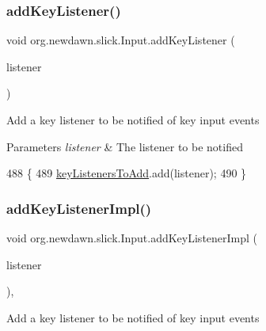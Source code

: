 \subsubsection{\texorpdfstring{add\+Key\+Listener()}{addKeyListener()}}
{\footnotesize\ttfamily void org.\+newdawn.\+slick.\+Input.\+add\+Key\+Listener (\begin{DoxyParamCaption}\item[{\mbox{\hyperlink{interfaceorg_1_1newdawn_1_1slick_1_1_key_listener}{Key\+Listener}}}]{listener }\end{DoxyParamCaption})\hspace{0.3cm}{\ttfamily [inline]}}

Add a key listener to be notified of key input events


\begin{DoxyParams}{Parameters}
{\em listener} & The listener to be notified \\
\hline
\end{DoxyParams}

\begin{DoxyCode}
488                                                      \{
489         \mbox{\hyperlink{classorg_1_1newdawn_1_1slick_1_1_input_a3bd9ce9ac5e9ac18f297b2e4382d3db9}{keyListenersToAdd}}.add(listener);
490     \}
\end{DoxyCode}
\mbox{\label{classorg_1_1newdawn_1_1slick_1_1_input_aa200a37a2a3c219b693e1cb2373e5de0}} 
\subsubsection{\texorpdfstring{add\+Key\+Listener\+Impl()}{addKeyListenerImpl()}}
{\footnotesize\ttfamily void org.\+newdawn.\+slick.\+Input.\+add\+Key\+Listener\+Impl (\begin{DoxyParamCaption}\item[{\mbox{\hyperlink{interfaceorg_1_1newdawn_1_1slick_1_1_key_listener}{Key\+Listener}}}]{listener }\end{DoxyParamCaption})\hspace{0.3cm}{\ttfamily [inline]}, {\ttfamily [private]}}

Add a key listener to be notified of key input events


